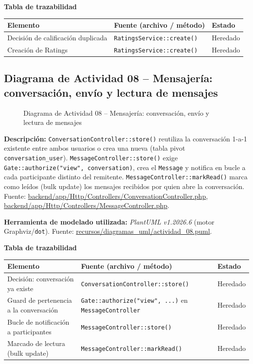 \bigskip
\noindent\textbf{Tabla de trazabilidad}
\begin{longtable}{|L{4cm}|L{7.5cm}|M{2.3cm}|}
\hline
{} \textbf{Elemento} & \textbf{Fuente (archivo / método)} & \textbf{Estado} \\ \hline
\endhead
Decisión de calificación duplicada & \texttt{RatingsService::create()} & Heredado \\ \hline
Creación de Ratings & \texttt{RatingsService::create()} & Heredado \\ \hline
\end{longtable}
\clearpage

\subsection{Diagrama de Actividad 08 -- Mensajería: conversación, envío y lectura de mensajes}
\begin{figure}[H]
    \centering
    \caption{Diagrama de Actividad 08 -- Mensajería: conversación, envío y lectura de mensajes}
    \label{fig:actividad08}
\end{figure}

{\sloppy\noindent\textbf{Descripción:} \texttt{ConversationController::store()} reutiliza la conversación 1-a-1 existente entre ambos usuarios o crea una nueva (tabla pivot \texttt{conversation\_user}). \texttt{MessageController::store()} exige \texttt{Gate::authorize("view", conversation)}, crea el \texttt{Message} y notifica en bucle a cada participante distinto del remitente. \texttt{MessageController::markRead()} marca como leídos (bulk update) los mensajes recibidos por quien abre la conversación. Fuente: \url{backend/app/Http/Controllers/ConversationController.php}, \url{backend/app/Http/Controllers/MessageController.php}.\par}

\bigskip
{\sloppy\noindent\textbf{Herramienta de modelado utilizada:} \textit{PlantUML v1.2026.6} (motor Graphviz/\texttt{dot}). Fuente: \url{recursos/diagramas_uml/actividad_08.puml}.\par}

\bigskip
\noindent\textbf{Tabla de trazabilidad}
\begin{longtable}{|L{4cm}|L{7.5cm}|M{2.3cm}|}
\hline
{} \textbf{Elemento} & \textbf{Fuente (archivo / método)} & \textbf{Estado} \\ \hline
\endhead
Decisión: conversación ya existe & \texttt{ConversationController::store()} & Heredado \\ \hline
Guard de pertenencia a la conversación & \texttt{Gate::authorize("view", ...)} en \texttt{MessageController} & Heredado \\ \hline
Bucle de notificación a participantes & \texttt{MessageController::store()} & Heredado \\ \hline
Marcado de lectura (bulk update) & \texttt{MessageController::markRead()} & Heredado \\ \hline
\end{longtable}
\clearpage

